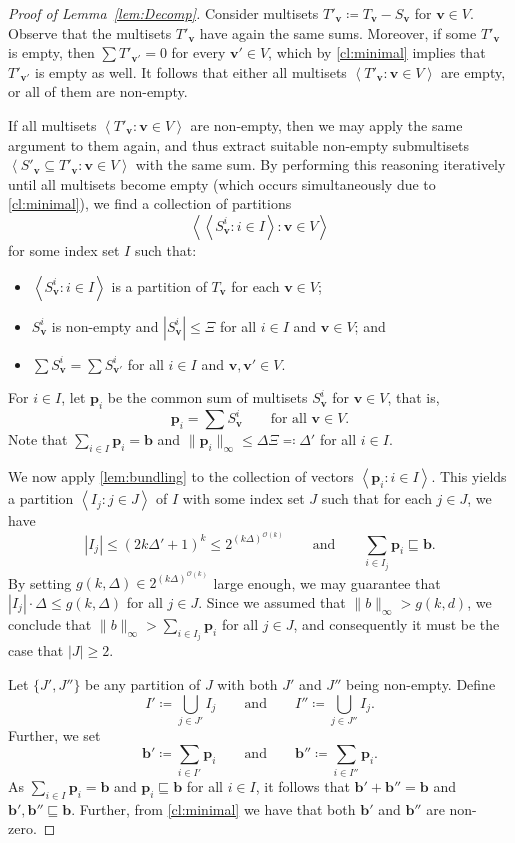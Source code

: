 \documentclass{theoretics}
\renewcommand{\leq}{\leqslant}
\renewcommand{\geq}{\geqslant}
\newcommand{\cfleq}{\sqsubseteq}
\newcommand{\tup}[1]{{\mathbf{#1}}}
\newcommand{\bb}{\tup b}
\newcommand{\pp}{\tup p}
\newcommand{\myvv}{\tup v} %
\newcommand{\mset}[1]{\left\langle #1\right\rangle}
\newcommand{\Oh}{{\mathcal{O}}}
\renewcommand{\setminus}{-}
\begin{document}
\begin{proof}[Proof of Lemma~\ref{lem:Decomp}]
Consider multisets $T'_\myvv\coloneqq T_\myvv\setminus S_\myvv$ for $\myvv\in V$. Observe that the multisets $T'_\myvv$ have again the same sums. Moreover, if some $T'_\myvv$ is empty, then $\sum T'_{\myvv'}=0$ for every $\myvv'\in V$, which by \cref{cl:minimal} implies that $T'_{\myvv'}$ is empty as well. It follows that either all multisets $\mset{T'_\myvv\colon \myvv\in V}$ are empty, or all of them are non-empty.

If all multisets $\mset{T'_\myvv\colon \myvv\in V}$ are non-empty, then we may apply the same argument to them again, and thus extract suitable non-empty submultisets $\mset{S'_\myvv\subseteq T'_\myvv\colon \myvv\in V}$ with the same sum. By performing this reasoning iteratively until all multisets become empty (which occurs simultaneously due to \cref{cl:minimal}), we find a collection of partitions
$$\mset{\mset{S_\myvv^i\colon i\in I}\colon \myvv\in V}$$
for some index set $I$ such that:
\begin{itemize}[nosep]
    \item $\mset{S_\myvv^i\colon i\in I}$ is a partition of $T_\myvv$ for each $\myvv\in V$;
    \item $S_\myvv^i$ is non-empty and $|S_\myvv^i|\leq \Xi$ for all $i\in I$ and $\myvv\in V$; and
    \item $\sum S^i_\myvv=\sum S^i_{\myvv'}$ for all $i\in I$ and $\myvv,\myvv'\in V$.
\end{itemize}
For $i\in I$, let $\pp_i$ be the common sum of multisets $S^i_\myvv$ for $\myvv\in V$, that is,
$$\pp_i= \sum S^i_\myvv\qquad\textrm{for all }\myvv\in V.$$
Note that $\sum_{i\in I}\pp_i = \bb$ and $\|\pp_i\|_\infty\leq \Delta\Xi\eqqcolon \Delta'$ for all $i\in I$.

We now apply \cref{lem:bundling} to the collection of vectors $\mset{\pp_i\colon i\in I}$. This yields a partition $\mset{I_j\colon j\in J}$ of $I$ with some index set $J$ such that for each $j\in J$, we have
$$|I_j|\leq (2k\Delta'+1)^{k}\leq  2^{(k\Delta)^{\Oh(k)}}\qquad\textrm{and}\qquad \sum_{i\in I_j} \pp_i\cfleq \bb.$$
By setting $g(k,\Delta)\in 2^{(k\Delta)^{\Oh(k)}}$ large enough, we may guarantee that $|I_j|\cdot \Delta\leq g(k,\Delta)$ for all $j\in J$. Since we assumed that $\|b\|_\infty>g(k,d)$, we conclude that $\|b\|_\infty>\sum_{i\in I_j} \pp_i$ for all $j\in J$, and consequently it must be the case that $|J|\geq 2$.

Let $\{J',J''\}$ be any partition of $J$ with both $J'$ and $J''$ being non-empty. Define
$$I'\coloneqq \bigcup_{j\in J'} I_j\qquad \textrm{and}\qquad I''\coloneqq \bigcup_{j\in J''} I_j.$$
Further, we set
$$\bb'\coloneqq \sum_{i\in I'} \pp_i\qquad \textrm{and}\qquad\bb''\coloneqq \sum_{i\in I''} \pp_i.$$
As $\sum_{i\in I} \pp_i=\bb$ and $\pp_i\cfleq \bb$ for all $i\in I$, it follows that $\bb'+\bb''=\bb$ and $\bb',\bb''\cfleq \bb$. Further, from \cref{cl:minimal} we have that both $\bb'$ and $\bb''$ are non-zero.


\end{proof}
\end{document}
